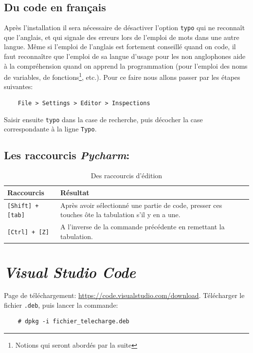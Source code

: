 \documentclass[a4paper,12pt]{book}
\begin{document}
\subsection*{Du code en français}
Après l'installation il sera nécessaire de désactiver l'option \texttt{typo} qui ne reconnaît que l'anglais, et qui signale des erreurs lors de l'emploi de mots dans une autre langue. Même si l'emploi de l'anglais est fortement conseillé quand on code, il faut reconnaître que l'emploi de sa langue d'usage pour les non anglophones aide à la compréhension quand on apprend la programmation (pour l'emploi des noms de variables, de fonctions\footnote{Notions qui seront abordés par la suite}, etc.). Pour ce faire nous allons passer par les étapes suivantes:
\begin{verbatim}
    File > Settings > Editor > Inspections
\end{verbatim}
Saisir ensuite \texttt{typo} dans la case de recherche, puis décocher la case correspondante à la ligne \texttt{Typo}.
\medskip

\subsection*{Les raccourcis \textit{Pycharm}:}
\begin{table}[h]
\begin{center}
\begin{tabular}{|p{4cm}|p{10cm}|}
\hline
\textbf{Raccourcis} & \textbf{Résultat} \\
\hline
\texttt{[Shift] + [tab]} & Après avoir sélectionné une partie de code, presser ces touches ôte la tabulation s'il y en a une. \\
\hline
\texttt{[Ctrl] + [Z]} & A l'inverse de la commande précédente en remettant la tabulation. \\
\hline
\end{tabular}
\caption{Des raccourcis d'édition}
\end{center}

\end{table}
\section{\textit{Visual Studio Code}}
Page de téléchargement: \url{https://code.visualstudio.com/download}. Télécharger le fichier \texttt{.deb}, puis lancer la commande:
\begin{verbatim}
    # dpkg -i fichier_telecharge.deb
\end{verbatim}
\medskip
\end{document}
